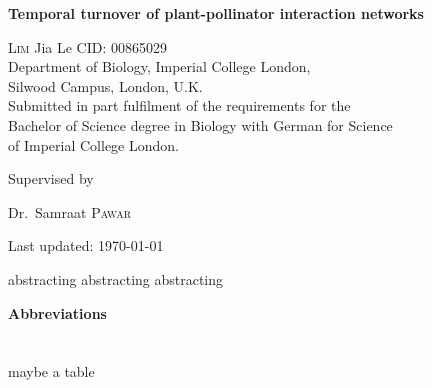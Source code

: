 \documentclass[11pt]{article}
\renewenvironment{abstract}
 {\hspace{.8cm}
  {\bfseries\huge\abstractname}
  \list{}{
    \setlength{\leftmargin}{.95cm}%
    \setlength{\rightmargin}{\leftmargin}%
  }%
  \item\relax}
 {\endlist}
\begin{document}
\begin{titlepage}
	\centering
	\vspace*{\fill}
	{\huge\bfseries Temporal turnover of plant-pollinator interaction networks \par}
	\vspace{2cm}
	{\Large \textsc{Lim} Jia Le  {    }  CID: 00865029}
	\\ 	\vspace{0.5cm}
	{Department of Biology, Imperial College London, \\Silwood Campus, London, U.K.} \\ \vspace{0.5cm}
	{Submitted in part fulfilment of the requirements for the \\ Bachelor of Science degree in Biology with German for Science \\ of Imperial College London.} \\
	\vspace*{\fill}
	{\large Supervised by\par
	Dr.~Samraat \textsc{Pawar}}
	\vfill
	{\large Last updated: \today\par}
\end{titlepage}



\newpage
{}
\vspace*{\fill}
\begin{abstract}  
\doublespacing
abstracting abstracting abstracting

\end{abstract}
\vfill

\newpage
{}
\vspace*{\fill}
\tableofcontents 
\vspace*{\fill} 
\thispagestyle{empty}

\doublespacing

\newpage 
\vspace*{\fill}
{\huge\bfseries Abbreviations} \\
\\
\\
\large{maybe a table}
\vfill
\end{document}
